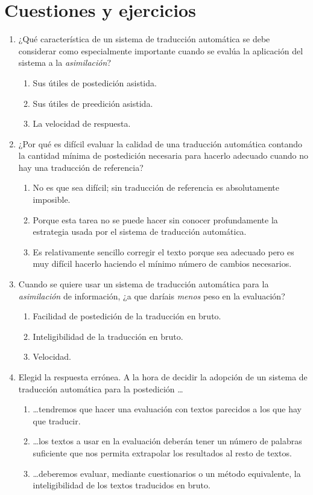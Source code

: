 \section{Cuestiones y ejercicios} 

\begin{enumerate} \item ¿Qué característica de un sistema de traducción automática se debe considerar como especialmente importante cuando se evalúa la aplicación del sistema a la \emph{asimilación}? \begin{enumerate} \item Sus útiles de postedición asistida. \item Sus útiles de preedición asistida. \item La velocidad de respuesta. \end{enumerate} 

\item ¿Por qué es difícil evaluar la calidad de una traducción automática contando la cantidad mínima de postedición necesaria para hacerlo adecuado cuando no hay una traducción de referencia? \begin{enumerate} \item No es que sea difícil; sin traducción de referencia es absolutamente imposible. \item Porque esta tarea no se puede hacer sin conocer profundamente la estrategia usada por el sistema de traducción automática. \item Es relativamente sencillo corregir el texto porque sea adecuado pero es muy difícil hacerlo haciendo el mínimo número de cambios necesarios. \end{enumerate} 

\item Cuando se quiere usar un sistema de traducción automática para la \emph{asimilación} de información, ¿a que daríais \emph{menos} peso en la evaluación? \begin{enumerate} \item Facilidad de postedición de la traducción en bruto. \item Inteligibilidad de la traducción en bruto. \item Velocidad. \end{enumerate} 

\item Elegid la respuesta errónea. A la hora de decidir la adopción de un sistema de traducción automática para la postedición \ldots\begin{enumerate} \item \ldots tendremos que hacer una evaluación con textos parecidos a los que hay que traducir. \item \ldots los textos a usar en la evaluación deberán tener un número de palabras suficiente que nos permita extrapolar los resultados al resto de textos. \item \ldots deberemos evaluar, mediante cuestionarios o un método equivalente, la inteligibilidad de los textos traducidos en bruto. \end{enumerate} 


\end{enumerate}
